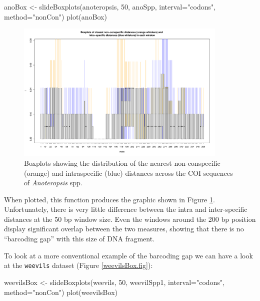\documentclass{article}
\newcommand{\fun}[1]{\texttt{#1}}
\begin{document}
\begin{console}
anoBox <- slideBoxplots(anoteropsis, 50, anoSpp, interval="codons", 
method="nonCon")
plot(anoBox)
\end{console}

\begin{figure}[p]
	\centering
	\includegraphics[width=0.9\textwidth]{slideBoxplots}
	\caption{Boxplots showing the distribution of the nearest non-conspecific (orange) and intraspecific (blue) distances across the COI sequences of \emph{Anoteropsis} spp.}
	\label{slideBoxplots.fig}
\end{figure}


When plotted, this function produces the graphic shown in Figure \ref{slideBoxplots.fig}. Unfortunately, there is very little difference between the intra and inter-specific distances at the 50 bp window size. Even the windows around the 200 bp position display significant overlap between the two measures, showing that there is no ``barcoding gap'' with this size of DNA fragment.

To look at a more conventional example of the barcoding gap we can have a look at the \fun{weevils} dataset (Figure \ref{weevilsBox.fig}):

\begin{console}
weevilsBox <- slideBoxplots(weevils, 50, weevilSpp1, interval="codons", 
method="nonCon")
plot(weevilsBox)
\end{console}
\end{document}

